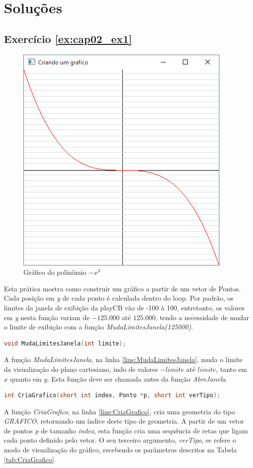 \section*{Soluções}

\subsection*{Exercício \ref{ex:cap02_ex1}}
\begin{figure}[ht]
  \centerline{\includegraphics[width=.5\textwidth]{img/cap2_ex8.png}}
  \caption{Gráfico do polinômio $-x^3$}
  \label{fig:cap02_ex1}
\end{figure}
Esta prática mostra como construir um gráfico a partir de um vetor de Pontos. Cada posição em \emph{y} de cada ponto é calculada dentro do loop. Por padrão, os limites da janela de exibição da playCB vão de -100 à 100, entretanto, os valores em \emph{y} nesta função variam de $-125.000$ até $125.000$, tendo a necessidade de mudar o limite de exibição com a função \emph{MudaLimitesJanela(125000)}.


\begin{lstlisting}[label={func:MudaLimitesJanela},language=C++]
void MudaLimitesJanela(int limite);
\end{lstlisting}
A função \emph{MudaLimitesJanela}, na linha \ref{line:MudaLimitesJanela}, muda o limite da visualização do plano cartesiano, indo de valores $-limite$ até $limite$, tanto em $x$ quanto em $y$. Esta função deve ser chamada antes da função \emph{AbreJanela}.

\begin{lstlisting}[label={func:CriaGrafico},language=C++]
int CriaGrafico(short int index, Ponto *p, short int verTipo);
\end{lstlisting}
A função \emph{CriaGrafico}, na linha \ref{line:CriaGrafico}, cria uma geometria do tipo \emph{GRAFICO}, retornando um índice deste tipo de geometria. A partir de um vetor de pontos \emph{p} de tamanho \emph{index}, esta função cria uma sequência de retas que ligam cada ponto definido pelo vetor. O seu terceiro argumento, \emph{verTipo}, se refere o modo de visualização do gráfico, recebendo os parâmetros descritos na Tabela \ref{tab:CriaGrafico}.

